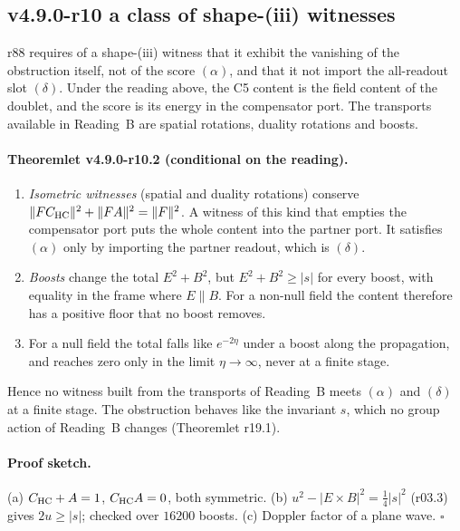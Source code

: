 \subsection*{v4.9.0-r10 a class of shape-(iii) witnesses}
\label{subsec:v490-r10-shape-three}

r88 requires of a shape-(iii) witness that it exhibit the vanishing of the obstruction itself, not of the score
\((\alpha)\), and that it not import the all-readout slot \((\delta)\).  Under the reading above, the C5 content is the field
content of the doublet, and the score is its energy in the compensator port.  The transports available in Reading~B are
spatial rotations, duality rotations and boosts.

\paragraph{Theoremlet v4.9.0-r10.2 (conditional on the reading).}
\begin{enumerate}[leftmargin=2em]
\item[(a)] \emph{Isometric witnesses} (spatial and duality rotations) conserve
\(\|FC_{\mathrm{HC}}\|^2+\|FA\|^2=\|F\|^2\).  A witness of this kind that empties the compensator port puts the whole content into the
partner port.  It satisfies \((\alpha)\) only by importing the partner readout, which is \((\delta)\).
\item[(b)] \emph{Boosts} change the total \(E^2+B^2\), but \(E^2+B^2\ge|s|\) for every boost, with equality in the frame
where \(E\parallel B\).  For a non-null field the content therefore has a positive floor that no boost removes.
\item[(c)] For a null field the total falls like \(e^{-2\eta}\) under a boost along the propagation, and reaches zero only in
the limit \(\eta\to\infty\), never at a finite stage.
\end{enumerate}
Hence no witness built from the transports of Reading~B meets \((\alpha)\) and \((\delta)\) at a finite stage.  The obstruction
behaves like the invariant \(s\), which no group action of Reading~B changes (Theoremlet r19.1).

\paragraph{Proof sketch.}
(a) \(C_{\mathrm{HC}}+A=1\), \(C_{\mathrm{HC}}A=0\), both symmetric.  (b) \(u^2-|E\times B|^2=\tfrac14|s|^2\) (r03.3) gives \(2u\ge|s|\); checked
over \(16200\) boosts.  (c) Doppler factor of a plane wave.  \(\square\)


